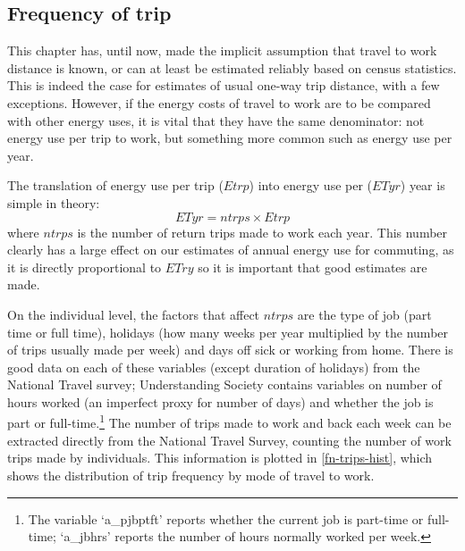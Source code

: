 \documentclass[a4paper, 11pt, twoside]{Thesis}
\begin{document}
\subsection{Frequency of trip} \label{sfreq}
This chapter has, until now, made the implicit assumption that
travel to work distance is known, or can at least be estimated reliably based on
census statistics. This is indeed the case for estimates of usual one-way trip
distance, with a few exceptions. However, if the energy costs of travel to work
are to be compared with other energy uses, it is vital that they have the same
denominator: not energy use per trip to work, but something more common such as
energy use per year.

The translation of energy use per trip ($Etrp$) into energy use per ($ETyr$)
year is simple in theory:
\begin{equation}
 ETyr = ntrps \times Etrp
\end{equation}
where $ntrps$ is the number of return trips made to work each year. This number
clearly has a large effect on our estimates of annual energy use for commuting,
as it is directly proportional to $ETry$ so it is important that good estimates
are made.

On the individual level, the factors that affect
$ntrps$ are the type of job (part time or full time), holidays
(how many weeks per year multiplied by the number of trips usually made per week)
and days off sick or working from home. There is good data on each of these
variables (except duration of holidays) from the National Travel survey;
Understanding Society contains variables on number of hours worked
(an imperfect proxy for number of days) and whether the job is part or
full-time.\footnote{The variable
`a\_pjbptft' reports whether the current job is part-time or full-time;
`a\_jbhrs' reports the number of hours normally worked per week.
}
The number of trips made to
work and back each week can be extracted directly from the National Travel
Survey, counting the number of work trips made by individuals.
This information is plotted in \cref{fn-trips-hist}, which shows the distribution
of trip frequency by mode of travel to work.
\end{document}
